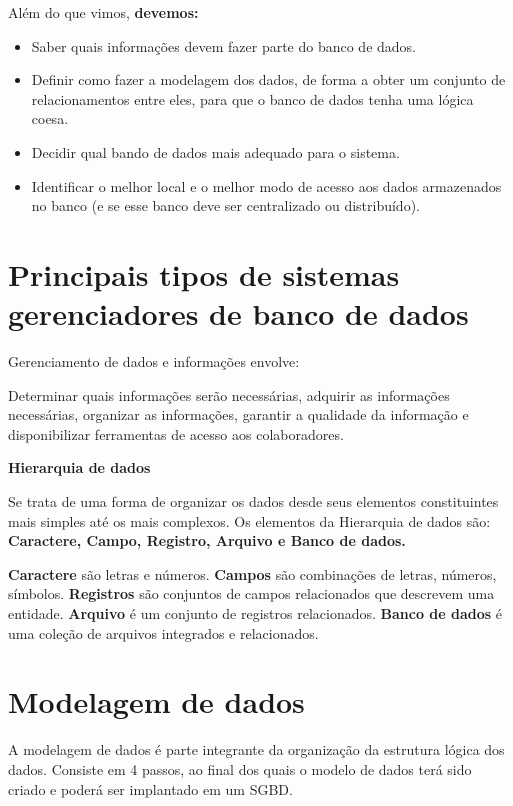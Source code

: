 \documentclass[12pt]{article}
\begin{document}
\noindent
Além do que vimos, \textbf{devemos:}

\begin{itemize}
    \item Saber quais informações devem fazer parte do banco de dados. 
    \item Definir como fazer a modelagem dos dados, de forma a obter um 
conjunto de relacionamentos entre eles, para que o banco de dados tenha uma 
lógica coesa.

    \item Decidir qual bando de dados mais adequado para o sistema.

    \item Identificar o melhor local e o melhor modo de acesso aos dados armazenados no banco
(e se esse banco deve ser centralizado ou distribuído).

\end{itemize}

\indent
\section{Principais tipos de sistemas gerenciadores de banco de dados}
Gerenciamento de dados e informações envolve: 

Determinar quais informações serão necessárias,
adquirir as informações necessárias, organizar as informações, garantir a qualidade da informação e 
disponibilizar ferramentas de acesso aos colaboradores.

\textbf{Hierarquia de dados}

Se trata de uma forma de organizar os dados desde seus elementos constituintes mais simples
até os mais complexos. Os elementos da Hierarquia de dados são:
\textbf{Caractere, Campo, Registro, Arquivo e Banco de dados.}

\textbf{Caractere} são letras e números.
\textbf{Campos} são combinações de letras, números, símbolos.
\textbf{Registros} são conjuntos de campos relacionados que descrevem uma entidade.
\textbf{Arquivo} é um conjunto de registros relacionados.
\textbf{Banco de dados} é uma coleção de arquivos integrados e relacionados.

\indent
\section{Modelagem de dados}
A modelagem de dados é parte integrante da organização da estrutura lógica dos dados.
Consiste em 4 passos, ao final dos quais o modelo de dados terá sido criado e poderá
ser implantado em um SGBD.
\end{document}
